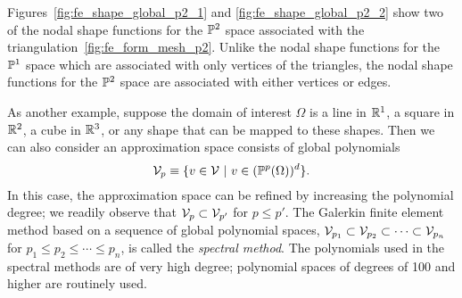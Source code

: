 Figures~\ref{fig:fe_shape_global_p2_1} and \ref{fig:fe_shape_global_p2_2} show two of the nodal shape functions for the $\mathbb{P}^2$ space associated with the triangulation~\ref{fig:fe_form_mesh_p2}.  Unlike the nodal shape functions for the $\mathbb{P}^1$ space which are associated with only vertices of the triangles, the nodal shape functions for the $\mathbb{P}^2$ space are associated with either vertices or edges.  

As another example, suppose the domain of interest $\Omega$ is a line in $\mathbb{R}^1$, a square in $\mathbb{R}^2$, a cube in $\mathbb{R}^3$, or any shape that can be mapped to these shapes. Then we can also consider an approximation space consists of global polynomials
\begin{equation*}
  \mathcal{V}_p \equiv \{ v \in \mathcal{V} \ | \ v \in (\mathbb{P}^p(\Omega))^d \}.
\end{equation*}
In this case, the approximation space can be refined by increasing the polynomial degree; we readily observe that $\mathcal{V}_{p} \subset \mathcal{V}_{p'}$ for $p \leq p'$. The Galerkin finite element method based on a sequence of global polynomial spaces, $\mathcal{V}_{p_1} \subset \mathcal{V}_{p_2} \subset \cdots \subset \mathcal{V}_{p_n}$ for $p_1 \leq p_2 \leq \cdots \leq p_n$, is called the \emph{spectral method}.  The polynomials used in the spectral methods are of very high degree; polynomial spaces of degrees of 100 and higher are routinely used.

